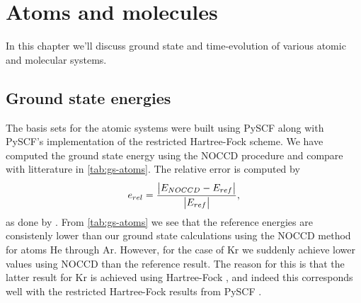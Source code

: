 \chapter{Atoms and molecules}
    In this chapter we'll discuss ground state and time-evolution of various
    atomic and molecular systems.

    \section{Ground state energies}
        The basis sets for the atomic systems were built using PySCF
        \cite{pyscf} along with PySCF's implementation of the restricted
        Hartree-Fock scheme.
        We have computed the ground state energy using the NOCCD procedure and
        compare with litterature in \autoref{tab:gs-atoms}.
        The relative error is computed by
        \begin{align}
            e_{rel}
            = \frac{\abs{E_{NOCCD} - E_{ref}}}{\abs{E_{ref}}},
        \end{align}
        as done by \citeauthor{hogberget2013quantum}
        \cite{hogberget2013quantum}.
        From \autoref{tab:gs-atoms} we see that the reference energies are
        consistenly lower than our ground state calculations using the NOCCD
        method for atoms He through Ar.
        However, for the case of Kr we suddenly achieve lower values using NOCCD
        than the reference result.
        The reason for this is that the latter result for Kr is achieved using
        Hartree-Fock \cite{partridge-nhf}, and indeed this corresponds well with
        the restricted Hartree-Fock results from PySCF \cite{pyscf}.

